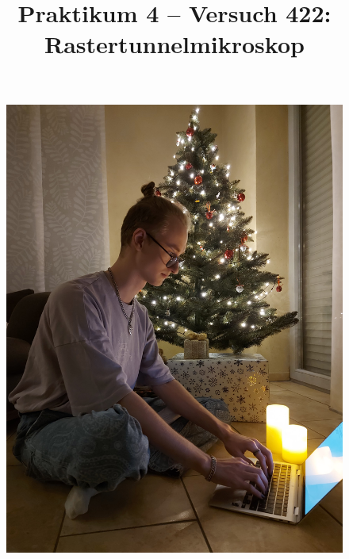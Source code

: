 \documentclass[sn-mathphys-num,iicol]{sn-jnl}
\theoremstyle{thmstyleone}
\theoremstyle{thmstyletwo}
\theoremstyle{thmstylethree}
\begin{document}
        
\title[]{Praktikum 4 -- Versuch 422: Rastertunnelmikroskop}
\author*[1]{ }
\author*[2]{ }

\maketitle

\begin{figure}[h]
  \centering
  \begin{minipage}{.2\textwidth}
  \centering
  \includegraphics[width=\textwidth]{Jonas.jpeg}
  \end{minipage}
  \begin{minipage}{.2\textwidth}
  \centering

\end{minipage}
\end{figure}
\end{document}
